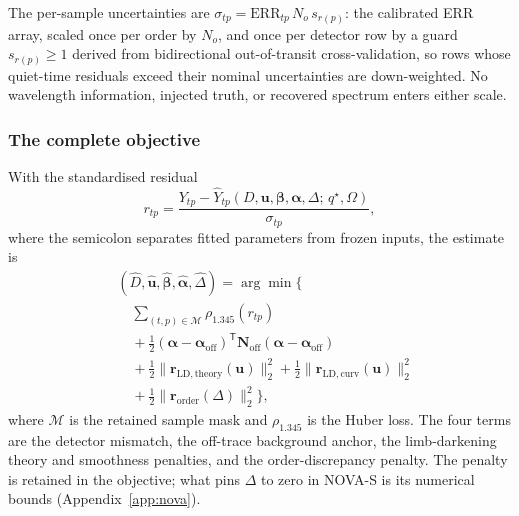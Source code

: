 The per-sample uncertainties are
$\sigma_{tp}=\mathrm{ERR}_{tp}\,N_o\,s_{r(p)}$: the calibrated ERR array,
scaled once per order by $N_o$, and once per detector row by a guard
$s_{r(p)}\geq 1$ derived from bidirectional out-of-transit
cross-validation, so rows whose quiet-time residuals exceed their nominal
uncertainties are down-weighted. No wavelength information, injected
truth, or recovered spectrum enters either scale.

\subsubsection{The complete objective}


With the standardised residual
\begin{equation}
 r_{tp}=\frac{Y_{tp}-\widehat Y_{tp}
 (D,\bm{u},\bm{\beta},\bm{\alpha},\Delta;\,q^\star,\Omega)}{\sigma_{tp}},
 \label{eq:residual}
\end{equation}
where the semicolon separates fitted parameters from frozen inputs, the
estimate is
\begin{equation}
\begin{split}
 &(\widehat D,\widehat{\bm{u}},\widehat{\bm{\beta}},
  \widehat{\bm{\alpha}},\widehat\Delta)
 = \arg\min\Big\{ \\
 &\quad\sum_{(t,p)\in\mathcal{M}}\rho_{1.345}(r_{tp}) \\
 &\quad+\tfrac{1}{2}(\bm{\alpha}-\bm{\alpha}_{\mathrm{off}})^{\mathsf T}
   \bm{N}_{\mathrm{off}}(\bm{\alpha}-\bm{\alpha}_{\mathrm{off}}) \\
 &\quad+\tfrac{1}{2}\|\bm{r}_{\mathrm{LD,theory}}(\bm{u})\|_2^2
  +\tfrac{1}{2}\|\bm{r}_{\mathrm{LD,curv}}(\bm{u})\|_2^2 \\
 &\quad+\tfrac{1}{2}\|\bm{r}_{\mathrm{order}}(\Delta)\|_2^2
 \Big\},
\end{split}
 \label{eq:objective}
\end{equation}
where $\mathcal{M}$ is the retained sample mask and $\rho_{1.345}$ is the
Huber loss. The four terms are the detector mismatch, the off-trace
background anchor, the limb-darkening theory and smoothness penalties, and
the order-discrepancy penalty. The penalty is retained in the objective;
what pins $\Delta$ to zero in NOVA-S is its numerical bounds
(Appendix~\ref{app:nova}).

